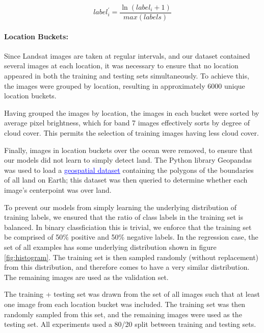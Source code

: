 \documentclass[10pt]{article}
\begin{document}
\begin{equation}
label^{\prime}_i = \frac{\ln(label_i + 1)}{max(labels)}
\end{equation}


\paragraph{Location Buckets:} Since Landsat images are taken at regular intervals,
and our dataset contained several images at each location, it was necessary to
ensure that no location appeared in both the training and testing sets simultaneously.
To achieve this, the images were grouped by location, resulting in approximately
6000 unique location buckets.


Having grouped the images by location, the images in each bucket were sorted
by average pixel brightness, which for band 7 images effectively sorts by degree
of cloud cover. This permits the selection of training images having less cloud cover.


Finally, images in location buckets over the ocean were removed, to ensure that our models
did not learn to simply detect land. The Python library Geopandas was used to load
a \href{https://www.naturalearthdata.com/}{\textcolor{blue}{\underline{geospatial dataset}}}
containing the polygons of the boundaries of all land on Earth; this dataset was
then queried to determine whether each image's centerpoint was over land.


To prevent our models from simply learning the underlying distribution
of training labels, we ensured that the ratio of class labels in the training
set is balanced. In binary classficiation this is trivial, we enforce that
the training set be comprised of 50\% positive and 50\% negative labels. In
the regression case, the set of all examples has some underlying distribution
shown in figure \ref{fig:histogram}. The training set is then sampled randomly
(without replacement) from this distribution, and therefore comes to have a very
similar distribution. The remaining images are used as the validation set.

The training + testing set was drawn from the set of all images such that at least
one image from each location bucket was included. The training set was then
randomly sampled from this set, and the remaining images were used as the testing set.
All experiments used a 80/20 split between training and testing sets.
\end{document}
